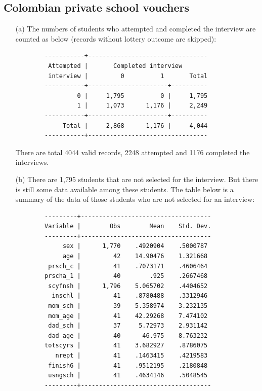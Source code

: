 \documentclass{article}
\begin{document}
\subsection*{Colombian private school vouchers}
\begin{enumerate}
    \item[(a)] The numbers of students who attempted and completed the interview are counted as below (records without lottery outcome are skipped): 
        \begin{verbatim}
        -----------+---------------------------------
         Attempted |       Completed interview
         interview |         0          1       Total
        -----------+----------------------+----------
                 0 |     1,795          0 |     1,795 
                 1 |     1,073      1,176 |     2,249 
        -----------+----------------------+----------
             Total |     2,868      1,176 |     4,044
        -----------+---------------------------------
        \end{verbatim}
    
    There are total 4044 valid records, 2248 attempted and 1176 completed the interviews.\\
    
    \item[(b)] There are 1,795 students that are not selected for the interview. But there is still some  data available among these students. The table below is a summary of the data of those students who are not selected for an interview: 
    
        \begin{verbatim}
        ---------+------------------------------------
        Variable |        Obs        Mean    Std. Dev.
        ---------+------------------------------------
             sex |      1,770    .4920904    .5000787 
             age |         42    14.90476    1.321668 
         prsch_c |         41    .7073171    .4606464 
        prscha_1 |         40        .925    .2667468 
         scyfnsh |      1,796    5.065702    .4404652 
          inschl |         41    .8780488    .3312946 
         mom_sch |         39    5.358974    3.232135 
         mom_age |         41    42.29268    7.474102 
         dad_sch |         37     5.72973    2.931142 
         dad_age |         40      46.975    8.763232 
        totscyrs |         41    3.682927    .8786075 
           nrept |         41    .1463415    .4219583 
         finish6 |         41    .9512195    .2180848 
         usngsch |         41    .4634146    .5048545 
        ---------+------------------------------------
        \end{verbatim}
     

\end{enumerate}
\end{document}
